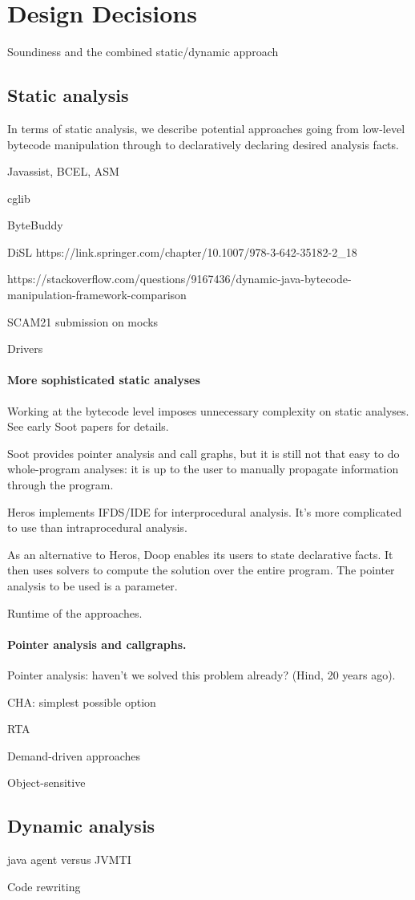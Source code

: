 \section{Design Decisions}
\label{sec:design-decisions}

Soundiness and the combined static/dynamic approach

\subsection{Static analysis}
In terms of static analysis, we describe potential approaches going
from low-level bytecode manipulation through to declaratively declaring
desired analysis facts.

Javassist, BCEL, ASM

cglib

ByteBuddy


DiSL https://link.springer.com/chapter/10.1007/978-3-642-35182-2_18

https://stackoverflow.com/questions/9167436/dynamic-java-bytecode-manipulation-framework-comparison



SCAM21 submission on mocks


Drivers

\paragraph{More sophisticated static analyses}
Working at the bytecode level imposes unnecessary complexity on
static analyses. See early Soot papers for details.

Soot provides pointer analysis and call graphs, but it is still
not that easy to do whole-program analyses: it is up to the user
to manually propagate information through the program.

Heros implements IFDS/IDE for interprocedural analysis.
It's more complicated to use than intraprocedural analysis.

As an alternative to Heros, Doop enables its users to state
declarative facts. It then uses solvers to compute the solution over the
entire program. The pointer analysis to be used is a parameter.

Runtime of the approaches.

\paragraph{Pointer analysis and callgraphs.}
Pointer analysis: haven't we solved this problem already? (Hind, 20 years ago).

CHA: simplest possible option

RTA

Demand-driven approaches

Object-sensitive


\subsection{Dynamic analysis}

java agent versus JVMTI

Code rewriting

